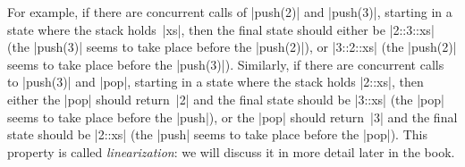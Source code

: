 \begin{questionS}
For example, if there are concurrent calls of |push(2)| and |push(3)|,
starting in a state where the stack holds~|xs|, then the final state should
either be |2::3::xs| (the |push(3)| seems to take place before the
|push(2)|), or |3::2::xs| (the |push(2)| seems to take place before the
|push(3)|).  Similarly, if there are concurrent calls to |push(3)| and |pop|,
starting in a state where the stack holds |2::xs|, then either the |pop|
should return~|2| and the final state should be |3::xs| (the |pop| seems to
take place before the |push|), or the |pop| should return~|3| and the final
state should be |2::xs| (the |push| seems to take place before the |pop|).
This property is called \emph{linearization}: we will discuss it in more
detail later in the book.
\end{questionS}


